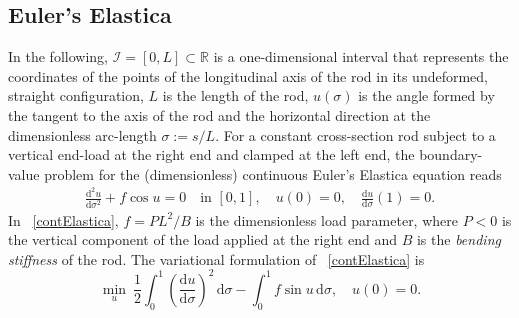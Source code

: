 \documentclass{article}
\theoremstyle{definition} %
\theoremstyle{plain} %
\theoremstyle{remark} %
\newcommand{\rr}{\mathbb{R}}
\begin{document}
\subsection{Euler's Elastica}

In the following, $\mathcal{I} = [0,L]\subset \rr$ is a one-dimensional interval that represents the coordinates of the points of the longitudinal axis of the rod in its undeformed, straight configuration, $L$ is the length of the rod, $u(\sigma)$ is the angle formed by the tangent to the axis of the rod and the horizontal direction at the dimensionless arc-length $\sigma := s/L$.
For a constant cross-section rod subject to a vertical end-load at the right end and clamped at the left end, the boundary-value problem for the (dimensionless) continuous Euler's Elastica equation reads \cite{audoly2000elasticity}
\begin{align}
        \frac{\textrm{d}^2 u}{\textrm{d}\sigma^2} + f \cos u = 0  \quad \text{in } [0,1], \quad u(0) = 0, \quad \frac{\textrm{d}u}{\textrm{d}\sigma}(1) = 0. \label{contElastica}
\end{align}
In ~\eqref{contElastica}, $f = PL^2/B$ is the dimensionless load parameter, where $P<0$ is the vertical component of the load applied at the right end and $B$ is the \textsl{bending stiffness} of the rod.
The variational formulation of ~\eqref{contElastica} is
\begin{equation}
        \min_{u}\ \frac{1}{2}\int_{0}^1 \left(\frac{\textrm{d}u}{\textrm{d}\sigma}\right)^2\,\textrm{d}\sigma - \int_{0}^1 f \sin u  \,\textrm{d}\sigma ,\quad u (0) = 0. \label{contElasticaEnergy}
\end{equation}
\end{document}
